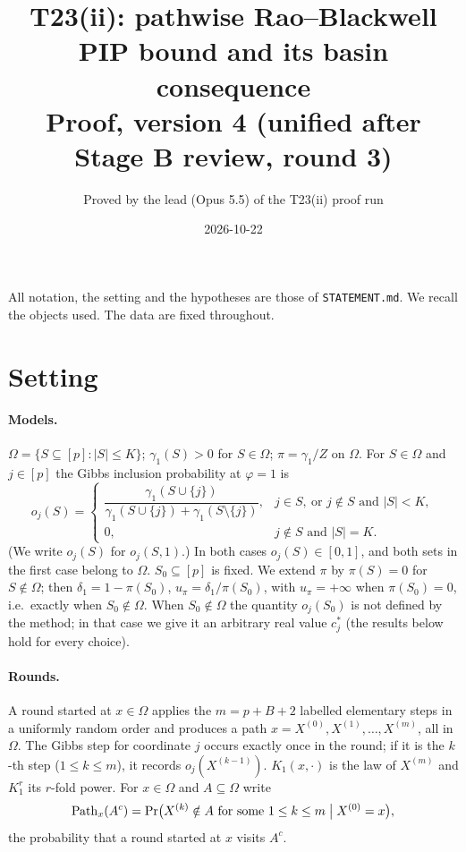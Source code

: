 \documentclass[11pt]{article}
\title{T23(ii): pathwise Rao--Blackwell PIP bound and its basin consequence\\[2pt]
\large Proof, version 4 (unified after Stage B review, round 3)}
\author{Proved by the lead (Opus 5.5) of the T23(ii) proof run}
\date{2026-10-22}
\theoremstyle{remark}
\begin{document}
\maketitle

\noindent All notation, the setting and the hypotheses are those of \texttt{STATEMENT.md}.
We recall the objects used. The data are fixed throughout.

\section{Setting}

\paragraph{Models.} $\Omega=\{S\subseteq[p]:|S|\le K\}$; $\gamma_1(S)>0$ for $S\in\Omega$; $\pi=\gamma_1/Z$ on $\Omega$.
For $S\in\Omega$ and $j\in[p]$ the Gibbs inclusion probability at $\varphi=1$ is
\[
o_j(S)=\begin{cases}
\dfrac{\gamma_1(S\cup\{j\})}{\gamma_1(S\cup\{j\})+\gamma_1(S\setminus\{j\})}, & j\in S,\ \text{or } j\notin S \text{ and } |S|<K,\\[8pt]
0, & j\notin S \text{ and } |S|=K .
\end{cases}
\]
(We write $o_j(S)$ for $o_j(S,1)$.) In both cases $o_j(S)\in[0,1]$, and both sets in the first case belong to $\Omega$.
$S_0\subseteq[p]$ is fixed. We extend $\pi$ by $\pi(S)=0$ for $S\notin\Omega$; then $\delta_1=1-\pi(S_0)$, $u_\pi=\delta_1/\pi(S_0)$, with $u_\pi=+\infty$ when $\pi(S_0)=0$, i.e.\ exactly when $S_0\notin\Omega$. When $S_0\notin\Omega$ the quantity $o_j(S_0)$ is not defined by the method; in that case we give it an arbitrary real value $c_j^\ast$ (the results below hold for every choice).

\paragraph{Rounds.} A round started at $x\in\Omega$ applies the $m=p+B+2$ labelled elementary steps in a uniformly random order and produces a path $x=X^{(0)},X^{(1)},\dots,X^{(m)}$, all in $\Omega$. The Gibbs step for coordinate $j$ occurs exactly once in the round; if it is the $k$-th step ($1\le k\le m$), it records $o_j(X^{(k-1)})$. $K_1(x,\cdot)$ is the law of $X^{(m)}$ and $K_1^{r}$ its $r$-fold power. For $x\in\Omega$ and $A\subseteq\Omega$ write
\[
\mathrm{Path}_x(A^c)=\Pr\bigl(X^{(k)}\notin A\text{ for some }1\le k\le m \bigm| X^{(0)}=x\bigr),
\]
the probability that a round started at $x$ visits $A^c$.
\end{document}
